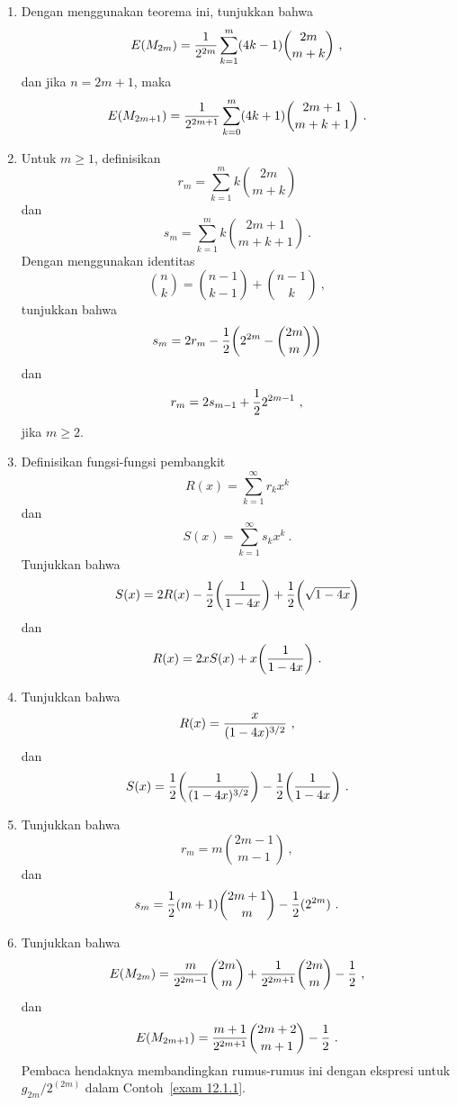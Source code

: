 \begin{LJSItem}
\begin{enumerate}

\item Dengan menggunakan teorema ini, tunjukkan bahwa
$$E(M_{2m}) = {1\over{2^{2m}}}\sum_{k = 1}^m (4k-1){2m \choose m+k}\ ,$$
dan jika $n = 2m+1$, maka
$$E(M_{2m+1}) = {1\over {2^{2m+1}}} \sum_{k = 0}^m (4k+1){2m+1\choose m+k+1}\ .$$

\item
Untuk $m \ge 1$, definisikan 
$$r_m = \sum_{k = 1}^m k {2m\choose m+k}$$
dan
$$s_m = \sum_{k = 1}^m k {2m+1\choose m+k+1}\ .$$
Dengan menggunakan identitas
$${n\choose k} = {n-1\choose k-1} + {n-1\choose k}\ ,$$
tunjukkan bahwa
$$s_m = 2r_m - {1\over 2}\biggl(2^{2m} - {2m \choose m}\biggr)$$
dan
$$r_m = 2s_{m-1} + {1\over 2}2^{2m-1}\ ,$$
jika $m \ge 2$.

\item
Definisikan fungsi-fungsi pembangkit
$$R(x) = \sum_{k = 1}^\infty r_k x^k$$
dan
$$S(x) = \sum_{k = 1}^\infty s_k x^k\ .$$
Tunjukkan bahwa
$$S(x) = 2 R(x) - {1\over 2}\biggl({1\over{1- 4x}}\biggr) + {1\over 2}\biggl(\sqrt{1-4x}\biggr)$$
dan
$$R(x) = 2xS(x) + x\biggl({1\over{1-4x}}\biggr)\ .$$

\item
Tunjukkan bahwa
$$R(x) = {x\over{(1-4x)^{3/2}}}\ ,$$
dan
$$S(x) = {1\over 2}\biggl({1\over{(1- 4x)^{3/2}}}\biggr) - 
{1\over 2}\biggl({1\over{1- 4x}}\biggr)\ .$$

\item
Tunjukkan bahwa
$$r_m = m{2m-1\choose m-1}\ ,$$
dan
$$s_m = {1\over 2}(m+1){2m+1\choose m} - {1\over 2}(2^{2m})\ .$$

\item
Tunjukkan bahwa
$$E(M_{2m}) = {m\over{2^{2m-1}}}{2m\choose m} + {1\over{2^{2m+1}}}{2m\choose m} - {1\over 2}\ ,$$
dan
$$E(M_{2m+1}) = {{m+1}\over{2^{2m+1}}}{2m+2\choose m+1} - {1\over 2}\ .$$
Pembaca hendaknya membandingkan rumus-rumus ini dengan ekspresi untuk
\linebreak $g_{2m}/2^{(2m)}$ dalam Contoh~\ref{exam 12.1.1}.
\end{enumerate}


\end{LJSItem}
